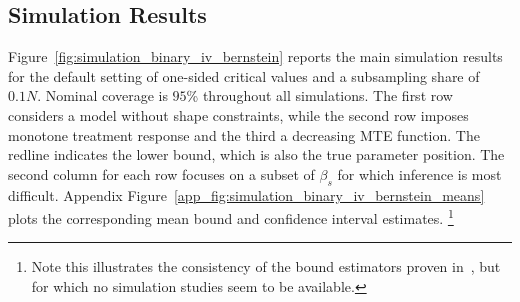 \documentclass[12pt,a4paper,english]{article} %
\numberwithin{equation}{section}
\theoremstyle{definition}
\theoremstyle{remark}
\theoremstyle{plain}
\begin{document}
\subsection{Simulation Results}
Figure~\ref{fig:simulation_binary_iv_bernstein} reports the main simulation results for the default setting of one-sided critical values and a subsampling share of $0.1N$.
Nominal coverage is $95$\% throughout all simulations. The first row considers a model without shape constraints, while the second row imposes monotone treatment response and the third a decreasing MTE function.
The redline indicates the lower bound, which is also the true parameter position.
The second column for each row focuses on a subset of $\beta_s$ for which inference is most difficult.
Appendix Figure~\ref{app_fig:simulation_binary_iv_bernstein_means} plots the corresponding mean bound and confidence interval estimates.
\footnote{Note this illustrates the consistency of the bound estimators proven in~\cite{mogstad2018using}, but for which no simulation studies seem to be available.}
\end{document}
